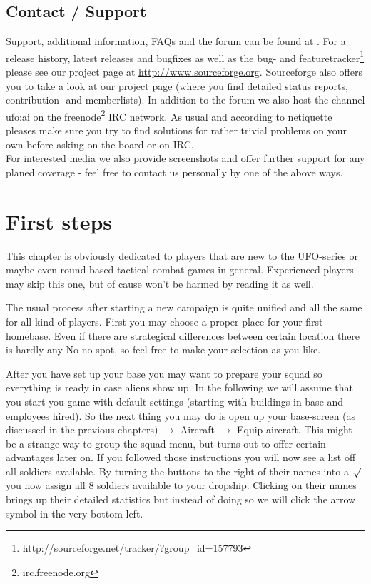 
\subsection{Contact / Support}
Support, additional information, FAQs and the forum can be found at \ufohomepage.
For a release history, latest releases and bugfixes as well as the bug- and featuretracker\footnote{\url{http://sourceforge.net/tracker/?group_id=157793}} please see our project page at \url{http://www.sourceforge.org}.
Sourceforge also offers you to take a look at our project page (where you find detailed status reports, contribution- and memberlists). In addition to the forum we also host the channel ufo:ai on the freenode\footnote{irc.freenode.org} IRC network. As usual and according to netiquette pleases make sure you try to find solutions for rather trivial problems on your own before asking on the board or on IRC.\\
For interested media we also provide screenshots and offer further support for any planed coverage - feel free to contact us personally by one of the above ways.

\section{First steps}
This chapter is obviously dedicated to players that are new to the UFO-series or maybe even round based tactical combat games in general. Experienced players may skip this one, but of cause won't be harmed by reading it as well.

The usual process after starting a new campaign is quite unified and all the same for all kind of players. First you may choose a proper place for your first homebase. Even if there are strategical differences between certain location there is hardly any No-no spot, so feel free to make your selection as you like.

After you have set up your base you may want to prepare your squad so everything is ready in case aliens show up. In the following we will assume that you start you game with default settings (starting with buildings in base and employees hired). So the next thing you may do is open up your base-screen (as discussed in the previous chapters) $\rightarrow$ Aircraft $\rightarrow$ Equip aircraft. This might be a strange way to group the squad menu, but turns out to offer certain advantages later on. If you followed those instructions you will now see a list off all soldiers available. By turning the  buttons to the right of their names into a $\surd$ you now assign all 8 soldiers available to your dropship. Clicking on their names brings up their detailed statistics but instead of doing so we will click the arrow symbol in the very bottom left.

